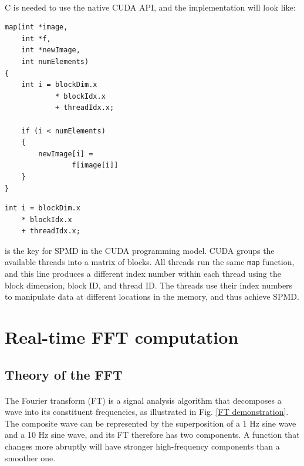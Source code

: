 \documentclass[12pt, twocolumn]{report}
\begin{document}
\paragraph{}
C is needed to use the native CUDA API, and the implementation will look like:
\begin{lstlisting}
map(int *image, 
    int *f,
    int *newImage, 
    int numElements) 
{
    int i = blockDim.x
            * blockIdx.x 
            + threadIdx.x;

    if (i < numElements) 
    {
        newImage[i] = 
                f[image[i]]
    }
}
\end{lstlisting}
\begin{lstlisting}
int i = blockDim.x
    * blockIdx.x 
    + threadIdx.x;
\end{lstlisting}
is the key for SPMD in the CUDA programming model. CUDA groups the available threads into a matrix of blocks. All threads run the same \lstinline{map} function, and this line produces a different index number within each thread using the block dimension, block ID, and thread ID. The threads use their index numbers to manipulate data at different locations in the memory, and thus achieve SPMD.

\section{Real-time FFT computation}
\subsection{Theory of the FFT}
\paragraph{}
The Fourier transform (FT) is a signal analysis algorithm that decomposes a wave into its constituent frequencies, as illustrated in Fig. \ref{FT demonstration}. The composite wave can be represented by the superposition of a 1 Hz sine wave and a 10 Hz sine wave, and its FT therefore has two components. A function that changes more abruptly will have stronger high-frequency components than a smoother one.
\end{document}
